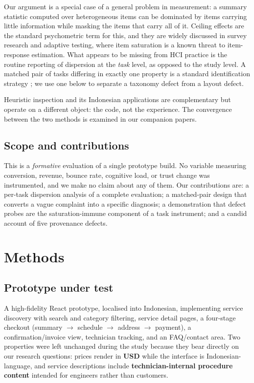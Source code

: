\documentclass[conference]{IEEEtran}
\begin{document}
Our argument is a special case of a general problem in measurement: a summary
statistic computed over heterogeneous items can be dominated by items carrying
little information while masking the items that carry all of it. Ceiling
effects are the standard psychometric term for this, and they are widely
discussed in survey research and adaptive testing, where item saturation is a
known threat to item-response estimation. What appears to be missing from HCI
practice is the routine reporting of dispersion at the \emph{task} level, as
opposed to the study level. A matched pair of tasks differing in exactly one
property is a standard identification strategy \cite{experimental}; we use one
below to separate a taxonomy defect from a layout defect.

Heuristic inspection \cite{nielsen} and its Indonesian applications
\cite{perdanakusuma,febriyanthi} are complementary but operate on a different
object: the code, not the experience. The convergence between the two methods
is examined in our companion papers.

\subsection{Scope and contributions}

This is a \emph{formative} evaluation of a single prototype build. No variable
measuring conversion, revenue, bounce rate, cognitive load, or trust change was
instrumented, and we make no claim about any of them. Our contributions are: a
per-task dispersion analysis of a complete evaluation; a matched-pair design
that converts a vague complaint into a specific diagnosis; a demonstration
that defect probes are the saturation-immune component of a task instrument;
and a candid account of five provenance defects.

\section{Methods}

\subsection{Prototype under test}

A high-fidelity React prototype, localised into Indonesian, implementing
service discovery with search and category filtering, service detail pages, a
four-stage checkout (summary $\rightarrow$ schedule $\rightarrow$ address
$\rightarrow$ payment), a confirmation/invoice view, technician tracking, and
an FAQ/contact area. Two properties were left unchanged during the study
because they bear directly on our research questions: prices render in
\textbf{USD} while the interface is Indonesian-language, and service
descriptions include \textbf{technician-internal procedure content} intended
for engineers rather than customers.
\end{document}
